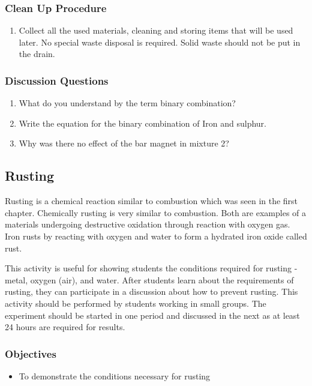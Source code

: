 \subsubsection*{Clean Up Procedure}
\begin{enumerate}
\item{Collect all the used materials, cleaning and storing items that will be used later. No special waste disposal is required. Solid waste should not be put in the drain.}
\end{enumerate}

\subsubsection*{Discussion Questions}
\begin{enumerate}
\item{What do you understand by the term binary combination?}
\item{Write the equation for the binary combination of Iron and sulphur.}
\item{Why was there no effect of the bar magnet in mixture 2?}
\end{enumerate}

\subsection{Rusting}

Rusting is a chemical reaction similar to combustion which was seen in the first chapter. Chemically rusting is very similar to combustion. Both are examples of a materials undergoing destructive oxidation through reaction with oxygen gas. Iron rusts by reacting with oxygen and water to form a hydrated iron oxide called rust.

This activity is useful for showing students the conditions required for rusting - metal, oxygen (air), and water. After students learn about the requirements of rusting, they can participate in a discussion about how to prevent rusting. This activity should be performed by students working in small groups. The experiment should be started in one period and discussed in the next as at least 24 hours are required for results.
\subsubsection*{Objectives}
\begin{itemize}
\item{To demonstrate the conditions necessary for rusting}
\end{itemize}

